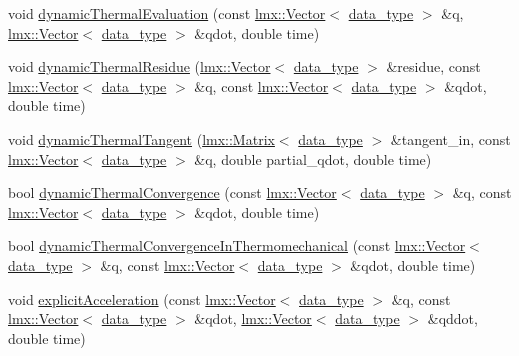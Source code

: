 \begin{DoxyCompactItemize}
void \hyperlink{classmknix_1_1_simulation_a4b2297b6adf5b7c2f0c65bae5ea75f7f}{dynamic\+Thermal\+Evaluation} (const \hyperlink{classlmx_1_1_vector}{lmx\+::\+Vector}$<$ \hyperlink{namespacemknix_a16be4b246fbf2cceb141e3a179111020}{data\+\_\+type} $>$ \&q, \hyperlink{classlmx_1_1_vector}{lmx\+::\+Vector}$<$ \hyperlink{namespacemknix_a16be4b246fbf2cceb141e3a179111020}{data\+\_\+type} $>$ \&qdot, double time)
\item 
void \hyperlink{classmknix_1_1_simulation_abc0f23c897ee438c5cb5c889134ad436}{dynamic\+Thermal\+Residue} (\hyperlink{classlmx_1_1_vector}{lmx\+::\+Vector}$<$ \hyperlink{namespacemknix_a16be4b246fbf2cceb141e3a179111020}{data\+\_\+type} $>$ \&residue, const \hyperlink{classlmx_1_1_vector}{lmx\+::\+Vector}$<$ \hyperlink{namespacemknix_a16be4b246fbf2cceb141e3a179111020}{data\+\_\+type} $>$ \&q, const \hyperlink{classlmx_1_1_vector}{lmx\+::\+Vector}$<$ \hyperlink{namespacemknix_a16be4b246fbf2cceb141e3a179111020}{data\+\_\+type} $>$ \&qdot, double time)
\item 
void \hyperlink{classmknix_1_1_simulation_afcf44a0289808f80bf6789a9671c9c55}{dynamic\+Thermal\+Tangent} (\hyperlink{classlmx_1_1_matrix}{lmx\+::\+Matrix}$<$ \hyperlink{namespacemknix_a16be4b246fbf2cceb141e3a179111020}{data\+\_\+type} $>$ \&tangent\+\_\+in, const \hyperlink{classlmx_1_1_vector}{lmx\+::\+Vector}$<$ \hyperlink{namespacemknix_a16be4b246fbf2cceb141e3a179111020}{data\+\_\+type} $>$ \&q, double partial\+\_\+qdot, double time)
\item 
bool \hyperlink{classmknix_1_1_simulation_ac54cb3aace5dd45148abc3a85766a107}{dynamic\+Thermal\+Convergence} (const \hyperlink{classlmx_1_1_vector}{lmx\+::\+Vector}$<$ \hyperlink{namespacemknix_a16be4b246fbf2cceb141e3a179111020}{data\+\_\+type} $>$ \&q, const \hyperlink{classlmx_1_1_vector}{lmx\+::\+Vector}$<$ \hyperlink{namespacemknix_a16be4b246fbf2cceb141e3a179111020}{data\+\_\+type} $>$ \&qdot, double time)
\item 
bool \hyperlink{classmknix_1_1_simulation_af310f0b95c688a929971996ebccc9090}{dynamic\+Thermal\+Convergence\+In\+Thermomechanical} (const \hyperlink{classlmx_1_1_vector}{lmx\+::\+Vector}$<$ \hyperlink{namespacemknix_a16be4b246fbf2cceb141e3a179111020}{data\+\_\+type} $>$ \&q, const \hyperlink{classlmx_1_1_vector}{lmx\+::\+Vector}$<$ \hyperlink{namespacemknix_a16be4b246fbf2cceb141e3a179111020}{data\+\_\+type} $>$ \&qdot, double time)
\item 
void \hyperlink{classmknix_1_1_simulation_a15821a26f81024ff00f5482b9de9249f}{explicit\+Acceleration} (const \hyperlink{classlmx_1_1_vector}{lmx\+::\+Vector}$<$ \hyperlink{namespacemknix_a16be4b246fbf2cceb141e3a179111020}{data\+\_\+type} $>$ \&q, const \hyperlink{classlmx_1_1_vector}{lmx\+::\+Vector}$<$ \hyperlink{namespacemknix_a16be4b246fbf2cceb141e3a179111020}{data\+\_\+type} $>$ \&qdot, \hyperlink{classlmx_1_1_vector}{lmx\+::\+Vector}$<$ \hyperlink{namespacemknix_a16be4b246fbf2cceb141e3a179111020}{data\+\_\+type} $>$ \&qddot, double time)

\end{DoxyCompactItemize}
